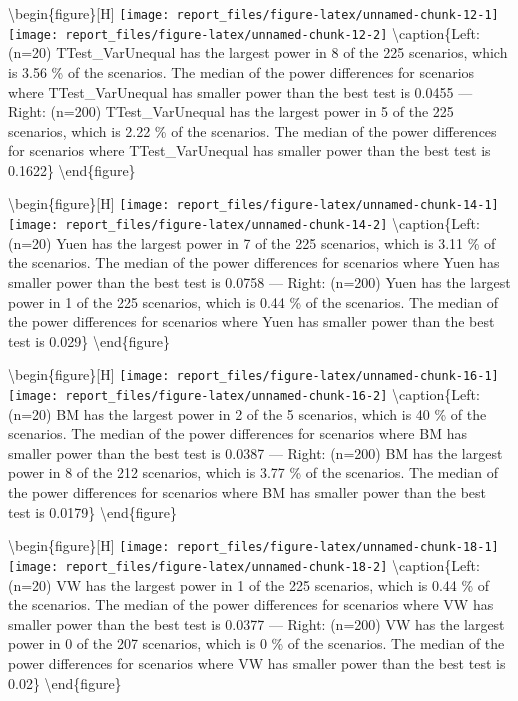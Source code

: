 \documentclass[
]{article}
\begin{document}
\textbackslash begin\{figure\}{[}H{]}
\texttt{[image: report\_files/figure-latex/unnamed-chunk-12-1]}
\texttt{[image: report\_files/figure-latex/unnamed-chunk-12-2]}
\textbackslash caption\{Left:(n=20) TTest\_VarUnequal has the largest
power in 8 of the 225 scenarios, which is 3.56 \% of the scenarios. The
median of the power differences for scenarios where TTest\_VarUnequal
has smaller power than the best test is 0.0455 --- Right: (n=200)
TTest\_VarUnequal has the largest power in 5 of the 225 scenarios, which
is 2.22 \% of the scenarios. The median of the power differences for
scenarios where TTest\_VarUnequal has smaller power than the best test
is 0.1622\}\label{fig:unnamed-chunk-12} \textbackslash end\{figure\}

\textbackslash begin\{figure\}{[}H{]}
\texttt{[image: report\_files/figure-latex/unnamed-chunk-14-1]}
\texttt{[image: report\_files/figure-latex/unnamed-chunk-14-2]}
\textbackslash caption\{Left:(n=20) Yuen has the largest power in 7 of
the 225 scenarios, which is 3.11 \% of the scenarios. The median of the
power differences for scenarios where Yuen has smaller power than the
best test is 0.0758 --- Right: (n=200) Yuen has the largest power in 1
of the 225 scenarios, which is 0.44 \% of the scenarios. The median of
the power differences for scenarios where Yuen has smaller power than
the best test is 0.029\}\label{fig:unnamed-chunk-14}
\textbackslash end\{figure\}

\textbackslash begin\{figure\}{[}H{]}
\texttt{[image: report\_files/figure-latex/unnamed-chunk-16-1]}
\texttt{[image: report\_files/figure-latex/unnamed-chunk-16-2]}
\textbackslash caption\{Left:(n=20) BM has the largest power in 2 of the
5 scenarios, which is 40 \% of the scenarios. The median of the power
differences for scenarios where BM has smaller power than the best test
is 0.0387 --- Right: (n=200) BM has the largest power in 8 of the 212
scenarios, which is 3.77 \% of the scenarios. The median of the power
differences for scenarios where BM has smaller power than the best test
is 0.0179\}\label{fig:unnamed-chunk-16} \textbackslash end\{figure\}

\textbackslash begin\{figure\}{[}H{]}
\texttt{[image: report\_files/figure-latex/unnamed-chunk-18-1]}
\texttt{[image: report\_files/figure-latex/unnamed-chunk-18-2]}
\textbackslash caption\{Left:(n=20) VW has the largest power in 1 of the
225 scenarios, which is 0.44 \% of the scenarios. The median of the
power differences for scenarios where VW has smaller power than the best
test is 0.0377 --- Right: (n=200) VW has the largest power in 0 of the
207 scenarios, which is 0 \% of the scenarios. The median of the power
differences for scenarios where VW has smaller power than the best test
is 0.02\}\label{fig:unnamed-chunk-18} \textbackslash end\{figure\}
\end{document}
